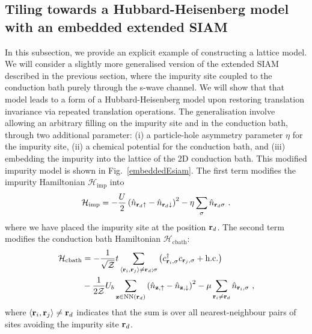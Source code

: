 \documentclass[reprint,hidelinks]{revtex4-2}
\begin{document}
\subsection{Tiling towards a Hubbard-Heisenberg model with an embedded extended SIAM}
In this subsection, we provide an explicit example of constructing a lattice model. We will consider a slightly more generalised version of the extended SIAM described in the previous section, where the impurity site coupled to the conduction bath purely through the s-wave channel. We will show that that model leads to a form of a Hubbard-Heisenberg model upon restoring translation invariance via repeated translation operations. The generalisation involve allowing an arbitrary filling on the impurity site and in the conduction bath, through two additional parameter: (i) a particle-hole asymmetry parameter \(\eta\) for the impurity site, (ii) a chemical potential for the conduction bath, and (iii) embedding the impurity into the lattice of the 2D conduction bath. This modified impurity model is shown in Fig.~\ref{embeddedEsiam}. The first term modifies the impurity Hamiltonian \(\mathcal{H}_\text{imp}\) into
\begin{equation}\begin{aligned}\label{onsiteHamiltonian}
	\mathcal{H}_\text{imp} = -\frac{U}{2}\left(\hat n_{{\bf r}_d \uparrow} - \hat n_{{\bf r}_d \downarrow} \right)^2 - \eta\sum_\sigma \hat n_{{\bf r}_d\sigma}~.
\end{aligned}\end{equation}
where we have placed the impurity site at the position \({\bf r}_d\). The second term modifies the conduction bath Hamiltonian \(\mathcal{H}_\text{cbath}\):
\begin{equation}\begin{aligned}\label{bathHamiltonian}
	\mathcal{H}_\text{cbath} &= -\frac{1}{\sqrt\mathcal{Z}}t\sum_{\left<{\bf r}_i, {\bf r}_j\right>\neq{\bf r}_d;\sigma}\left(c^\dagger_{{\bf r}_i,\sigma}c_{{\bf r}_j,\sigma} + \text{h.c.}\right)\\
							 &- \frac{1}{2 \mathcal{Z}}U_b\sum_{{\bf z}\in\text{NN}({\bf r}_d)}\left(\hat n_{{\bf z}, \uparrow} - \hat n_{{\bf z}, \downarrow}\right)^2 - \mu \sum_{{\bf r}_i \neq {\bf r}_d}\hat n_{{\bf r}_i,\sigma}~,
\end{aligned}\end{equation}
where \(\left<{\bf r}_i, {\bf r}_j\right>\neq {\bf r}_d\) indicates that the sum is over all nearest-neighbour pairs of sites avoiding the impurity site \({\bf r}_d\).
\end{document}
